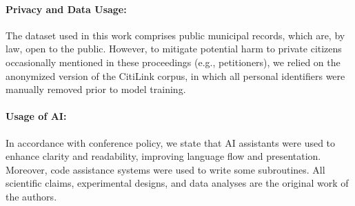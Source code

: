\documentclass[11pt]{article}
\begin{document}
\paragraph{Privacy and Data Usage:} The dataset used in this work comprises public municipal records, which are, by law, open to the public. However, to mitigate potential harm to private citizens occasionally mentioned in these proceedings (e.g., petitioners), we relied on the anonymized version of the CitiLink corpus, in which all personal identifiers were manually removed prior to model training.

\paragraph{Usage of AI:} In accordance with conference policy, we state that AI assistants were used to enhance clarity and readability, improving language flow and presentation. Moreover, code assistance systems were used to write some subroutines. All scientific claims, experimental designs, and data analyses are the original work of the authors.





\end{document}
